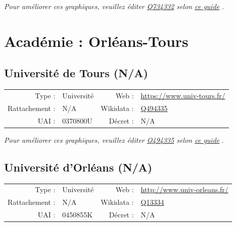 \documentclass[12pt,french,landscape]{article}
\begin{document}
\textit{\scriptsize Pour améliorer ces graphiques, veuillez éditer \href{https://www.wikidata.org/entity/Q734332}{Q734332}  selon \href{https://github.com/cpesr/wikidataESR/blob/master/Rmd/wikidataESR.md}{ce guide}}
.


\newpage

\hypertarget{acaduxe9mie-orluxe9ans-tours}{%
\section{Académie : Orléans-Tours}\label{acaduxe9mie-orluxe9ans-tours}}

\hypertarget{universituxe9-de-tours-na}{%
\subsection{Université de Tours (N/A)}\label{universituxe9-de-tours-na}}

\begin{tabular*}{0.45\textwidth}{rp{2cm}rl}  
\hline  
Type : & Université & Web : &\href{https://www.univ-tours.fr/}{https://www.univ-tours.fr/} \\  
Rattachement : & N/A & Wikidata : & \href{https://www.wikidata.org/entity/Q494335}{Q494335} \\  
UAI : & 0370800U & Décret : & N/A \\  
\hline  
\end{tabular*}

\textit{\scriptsize Pour améliorer ces graphiques, veuillez éditer \href{https://www.wikidata.org/entity/Q494335}{Q494335}  selon \href{https://github.com/cpesr/wikidataESR/blob/master/Rmd/wikidataESR.md}{ce guide}}
.


\newpage

\hypertarget{universituxe9-dorluxe9ans-na}{%
\subsection{Université d'Orléans
(N/A)}\label{universituxe9-dorluxe9ans-na}}

\begin{tabular*}{0.45\textwidth}{rp{2cm}rl}  
\hline  
Type : & Université & Web : &\href{http://www.univ-orleans.fr/}{http://www.univ-orleans.fr/} \\  
Rattachement : & N/A & Wikidata : & \href{https://www.wikidata.org/entity/Q13334}{Q13334} \\  
UAI : & 0450855K & Décret : & N/A \\  
\hline  
\end{tabular*}
\end{document}
